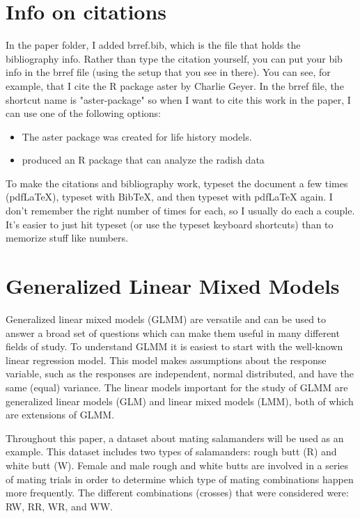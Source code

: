 \documentclass{article}
\begin{document}
\section{Info on citations}
In the paper folder, I added brref.bib, which is the file that holds the bibliography info. Rather than  type the citation yourself, you can put your bib info in the brref file (using the setup that you see in there). You can see, for example, that I cite the R package aster by Charlie Geyer. In the brref file, the shortcut name is "aster-package" so when I want to cite this work in the paper, I can use one of the following options:
\begin{itemize}
\item The aster package \citep{aster-package} was created for life history models.
\item  \citet{aster-package} produced an R package that can analyze the radish data 
\end{itemize}

To make the citations and bibliography work, typeset the document a few times (pdfLaTeX), typeset with BibTeX, and then typeset with pdfLaTeX again. I don't remember the right number of times for each, so I usually do each a couple. It's easier to just hit typeset (or use the typeset keyboard shortcuts) than to memorize stuff like numbers. 

\section{Generalized Linear Mixed Models}
Generalized linear mixed models (GLMM) are versatile and can be used to answer a broad set of questions which can make them useful in many different fields of study.  To understand GLMM it is easiest to start with the well-known linear regression model.  This model makes assumptions about the response variable, such as the responses are independent, normal distributed, and have the same (equal) variance.  The linear models important for the study of GLMM are generalized linear models (GLM) and linear mixed models (LMM), both of which are extensions of GLMM. 

Throughout this paper, a dataset about mating salamanders will be used as an example.  This dataset includes two types of salamanders: rough butt (R) and white butt (W).  Female and male rough and white butts are involved in a series of mating trials in order to determine which type of mating combinations happen more frequently.  The different combinations (crosses) that were considered were: RW, RR, WR, and WW.
	
\end{document}
